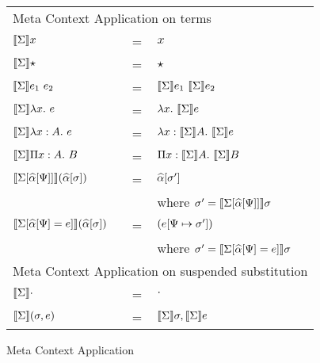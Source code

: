 

\begin{figure}
    \begin{tabular}{lll}
      \multicolumn{3}{l}{Meta Context Application on terms}\\
        $\llbracket{\Sigma}\rrbracket x $ & = & $x$ \\
        $\llbracket{\Sigma}\rrbracket \star $ & = & $\star$ \\
        $\llbracket{\Sigma}\rrbracket e_1 ~ e_2 $ & = & ${\llbracket{\Sigma}\rrbracket e_1} ~ {\llbracket{\Sigma}\rrbracket e_2}$ \\
        $\llbracket{\Sigma}\rrbracket \lambda {x}.~ e $ & = & $\lambda {x}.~ {\llbracket{\Sigma}\rrbracket e}$ \\
        $\llbracket{\Sigma}\rrbracket \lambda x:A.~ e $ & = & $\lambda x:\llbracket{\Sigma}\rrbracket A.~ {\llbracket{\Sigma}\rrbracket e}$ \\
        $\llbracket{\Sigma}\rrbracket \Pi x:A.~ B $ & = & $\Pi x:\llbracket{\Sigma}\rrbracket A.~ {\llbracket{\Sigma}\rrbracket B}$ \\
        $\llbracket{\Sigma[\widehat{\alpha}[\Psi]]}\rrbracket (\widehat{\alpha}[\sigma]) $ & = & $\widehat{\alpha}[\sigma'] $ \\
           & & where $\sigma' = \llbracket{\Sigma[\widehat{\alpha}[\Psi]]}\rrbracket \sigma$\\
        $\llbracket{\Sigma[\widehat{\alpha}[\Psi] = e]}\rrbracket (\widehat{\alpha}[\sigma]) $ & = & ${(e [\Psi \mapsto \sigma'])} $ \\
           & & where $\sigma' = \llbracket{\Sigma[\widehat{\alpha}[\Psi] = e]}\rrbracket \sigma$\\
      \multicolumn{3}{l}{Meta Context Application on suspended substitution}\\
        $\llbracket{\Sigma}\rrbracket \cdot $ & = & $\cdot$ \\
        $\llbracket{\Sigma}\rrbracket (\sigma, e) $ & = & $\llbracket{\Sigma}\rrbracket \sigma, \llbracket{\Sigma}\rrbracket e$ \\
    \end{tabular}
    \caption{Meta Context Application}
    \label{figure:erasure}
\end{figure}


